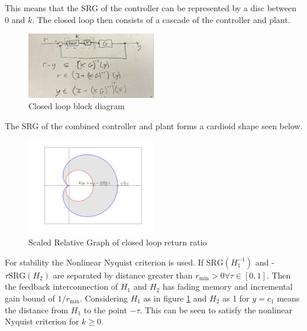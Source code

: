 \documentclass{article}
\begin{document}
This means that the SRG of the controller can be represented by a disc between 0 and $k$.
The closed loop then consists of a cascade of the controller and plant.

\begin{figure}[H]
    \centering
    \includegraphics[width=0.5\textwidth]{figures/closed_loop.jpg}
    \caption{Closed loop block diagram}
\end{figure}
The SRG of the combined controller and plant forms a cardioid shape seen below.

\begin{figure}[H]
    \centering
    \includegraphics[width=0.5\textwidth]{figures/closed_loop_return_ratio.png}
    \caption{Scaled Relative Graph of closed loop return ratio}
    \label{fig:return_ratio_srg}
\end{figure}

For stability the Nonlinear Nyquist criterion is used.
If $\text{SRG}(H_1^{-1})$ and -$\tau \text{SRG}(H_2)$ are separated by distance greater than $r_\text{min} > 0 \forall \tau \in [0,1]$.
Then the feedback interconnection of $H_1$ and $H_2$ has fading memory and incremental gain bound of $1/r_\text{min}$.
Considering $H_1$ as in figure \ref{fig:return_ratio_srg} and $H_2$ as 1 for $y=c_1$ means the distance from $H_1$ to the point $-\tau$.
This can be seen to satisfy the nonlinear Nyquist criterion for $k \geq 0$.
\end{document}
